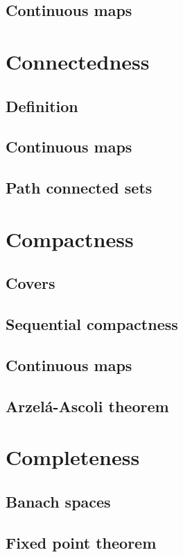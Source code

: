 \documentclass[../Year2.tex]{subfiles}
\begin{document}
\subsection{Continuous maps}

\section{Connectedness}

\subsection{Definition}

\subsection{Continuous maps}

\subsection{Path connected sets}

\section{Compactness}

\subsection{Covers}

\subsection{Sequential compactness}

\subsection{Continuous maps}

\subsection{Arzelá-Ascoli theorem}

\section{Completeness}

\subsection{Banach spaces}

\subsection{Fixed point theorem}
\end{document}
